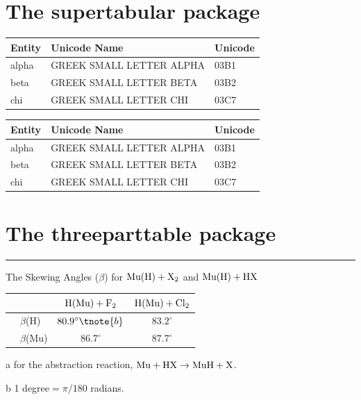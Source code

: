\ifx\supertabular\undefined \else
\clearpage
\section{The supertabular package}

\begin{center}
\begin{supertabular}{lll}
\bfseries Entity&\bfseries  Unicode Name&\bfseries  Unicode\\
\hline
alpha              & GREEK SMALL LETTER ALPHA            & 03B1\\
beta               & GREEK SMALL LETTER BETA             & 03B2\\
chi                & GREEK SMALL LETTER CHI              & 03C7\\
\end{supertabular}
\end{center}

\begin{center}
\label{supertabular.2}
\begin{supertabular}{lll}
\bfseries Entity&\bfseries  Unicode Name&\bfseries  Unicode\\
\hline
alpha              & GREEK SMALL LETTER ALPHA            & 03B1\\
beta               & GREEK SMALL LETTER BETA             & 03B2\\
chi                & GREEK SMALL LETTER CHI              & 03C7\\
\end{supertabular}
\end{center}
\fi

\ifx\threeparttable\undefined \else
\clearpage
\section{The threeparttable package}

\hrule

\begin{center}
\begin{threeparttable}
\caption{The Skewing Angles ($\beta$) for $\fam0 Mu(H)+X_2$ and
   $\fam0 Mu(H)+HX$~}
   \label{threeparttable.1}
\begin{tabular}{rlcc}
\hline
&   & $\fam0 H(Mu)+F_2$ & $\fam0 H(Mu)+Cl_2$ \\
\hline
&$\beta$(H)  & $80.9^\circ\tnote{b}$ & $83.2^\circ$ \\
&$\beta$(Mu) & $86.7^\circ$ & $87.7^\circ$ \\
\hline
\end{tabular}
\begin{tablenotes}
\item[a] for the abstraction reaction, $\fam0 Mu+HX \rightarrow MuH+X$.
\item[b] 1 degree${} = \pi/180$ radians.
\end{tablenotes}
\end{threeparttable}
\end{center}

